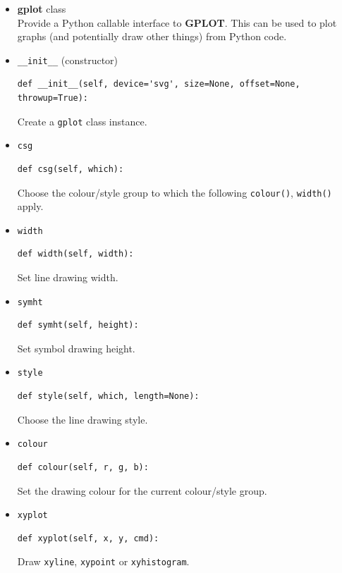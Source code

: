 \documentclass[a4paper,twoside,11pt]{article}
\begin{document}
\begin{itemize}
 
\item{\textbf{gplot} class}\\
Provide a Python callable interface to \textbf{GPLOT}.
This can be used to plot graphs (and potentially draw other things) from Python code.

\item{\texttt{\_\_init\_\_} (constructor)}\\
\begin{lstlisting}
def __init__(self, device='svg', size=None, offset=None, throwup=True):
\end{lstlisting}
Create a \texttt{gplot} class instance.

\item{\texttt{csg}}\\
\begin{lstlisting}
def csg(self, which):
\end{lstlisting}
Choose the colour/style group to which the following \texttt{colour()}, \texttt{width()} apply.

\item{\texttt{width}}\\
\begin{lstlisting}
def width(self, width):
\end{lstlisting}
Set line drawing width.

\item{\texttt{symht}}\\
\begin{lstlisting}
def symht(self, height):
\end{lstlisting}
Set symbol drawing height.

\item{\texttt{style}}\\
\begin{lstlisting}
def style(self, which, length=None):
\end{lstlisting}
Choose the line drawing style.

\item{\texttt{colour}}\\
\begin{lstlisting}
def colour(self, r, g, b):
\end{lstlisting}
Set the drawing colour for the current colour/style group.

\item{\texttt{xyplot}}\\
\begin{lstlisting}
def xyplot(self, x, y, cmd):
\end{lstlisting}
Draw \texttt{xyline}, \texttt{xypoint} or \texttt{xyhistogram}.


\end{itemize}
\end{document}

